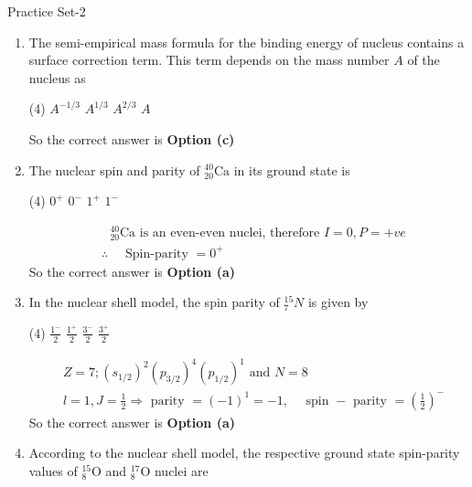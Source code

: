 \newpage
\begin{abox}
	Practice Set-2
\end{abox}
\begin{enumerate}
	\item The semi-empirical mass formula for the binding energy of nucleus contains a surface correction term. This term depends on the mass number $A$ of the nucleus as
	{}
	\begin{tasks}(4)
		\task[\textbf{a.}]$A^{-1 / 3}$
		\task[\textbf{b.}]$A^{1 / 3}$
		\task[\textbf{c.}]$A^{2 / 3}$
		\task[\textbf{d.}] $A$
	\end{tasks}
	\begin{answer}
		So the correct answer is \textbf{Option (c)}
	\end{answer}
	\item  The nuclear spin and parity of ${ }_{20}^{40} \mathrm{Ca}$ in its ground state is
	{}
	\begin{tasks}(4)
		\task[\textbf{a.}]$0^{+}$
		\task[\textbf{b.}]$0^{-}$
		\task[\textbf{c.}]$1^{+}$
		\task[\textbf{d.}] $1^{-}$
	\end{tasks}
	\begin{answer}
		\begin{align*}
		&\text{ ${ }_{20}^{40} \mathrm{Ca}$ is an even-even nuclei, therefore $I=0, P=+v e$}\\
		&\therefore \quad \text { Spin-parity }=0^{+}
		\end{align*}
		So the correct answer is \textbf{Option (a)}
	\end{answer}
	\item  In the nuclear shell model, the spin parity of ${ }_7^{15} N$ is given by
	{}
	\begin{tasks}(4)
		\task[\textbf{a.}]$\frac{1^{-}}{2}$
		\task[\textbf{b.}]$\frac{1^{+}}{2}$
		\task[\textbf{c.}]$\frac{3^{-}}{2}$
		\task[\textbf{d.}]$\frac{3^{+}}{2}$
	\end{tasks}
	\begin{answer}
		\begin{align*}
		&\text{$Z=7 ;\left(s_{1 / 2}\right)^2\left(p_{3 / 2}\right)^4\left(p_{1 / 2}\right)^1$ and $N=8$}\\
		&l=1, J=\frac{1}{2} \Rightarrow \text { parity }=(-1)^1=-1, \quad \text { spin }-\text { parity }=\left(\frac{1}{2}\right)^{-}
		\end{align*}
		So the correct answer is \textbf{Option (a)}
	\end{answer}
	\item  According to the nuclear shell model, the respective ground state spin-parity values of ${ }_8^{15} \mathrm{O}$ and ${ }_8^{17} \mathrm{O}$ nuclei are

\end{enumerate}
